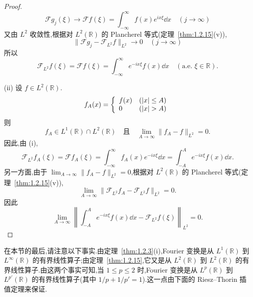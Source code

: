 \begin{proof}
\begin{equation*}
\mathcal{F}g_{j}(\xi) \to \mathcal{F}f(\xi) = \int_{-\infty}^{\infty} f(x)e^{ix\xi}\dd x \quad (j \to \infty)
\end{equation*}
又由 $L^{2}$ 收敛性,根据对 $L^{2}(\mathbb{R})$ 的 Plancherel 等式(定理~\ref{thm:1.2.15}(v)),
\begin{equation*}
\|\mathcal{F}g_{j} - \mathcal{F}_{L^{2}}f\|_{L^{2}} \to 0 \quad (j \to \infty)
\end{equation*}
所以
\begin{equation*}
\mathcal{F}_{L^{2}}f(\xi) = \mathcal{F}f(\xi) = \int_{-\infty}^{\infty} e^{-ix\xi}f(x)\dd x \quad (\text{a.e. } \xi \in \mathbb{R}).
\end{equation*}

(ii) 设 $f \in L^{2}(\mathbb{R})$.
\begin{equation*}
f_{A}(x) = \left\{ \begin{array}{l l}
f(x) & (|x| \leq A) \\
0 & (|x| > A)
\end{array} \right.
\end{equation*}
则
\begin{equation*}
f_{A} \in L^{1}(\mathbb{R}) \cap L^{2}(\mathbb{R}) \quad \text{且} \quad \lim_{A \to \infty}\|f_{A} - f\|_{L^{2}} = 0.
\end{equation*}
因此,由 (i),
\begin{equation*}
\mathcal{F}_{L^{2}}f_{A}(\xi) = \mathcal{F}f_{A}(\xi) = \int_{-\infty}^{\infty} f_{A}(x)e^{-ix\xi}\dd x = \int_{-A}^{A} e^{-ix\xi}f(x)\dd x.
\end{equation*}
另一方面,由于 $\lim_{A \to \infty}\|f_{A} - f\|_{L^{2}} = 0$,根据对 $L^{2}(\mathbb{R})$ 的 Plancherel 等式(定理~\ref{thm:1.2.15}(v)),
\begin{equation*}
\lim_{A \to \infty}\|\mathcal{F}_{L^{2}}f_{A} - \mathcal{F}_{L^{2}}f\|_{L^{2}} = 0.
\end{equation*}
因此
\begin{equation*}
\lim_{A \to \infty}\left\| \int_{-A}^{A} e^{-ix\xi}f(x)\dd x - \mathcal{F}_{L^{2}}f(\xi) \right\|_{L^{2}} = 0.
\end{equation*}
\end{proof}

在本节的最后,请注意以下事实.由定理~\ref{thm:1.2.3}(i),Fourier 变换是从 $L^{1}(\mathbb{R})$ 到 $L^{\infty}(\mathbb{R})$ 的有界线性算子;由定理~\ref{thm:1.2.15},它又是从 $L^{2}(\mathbb{R})$ 到 $L^{2}(\mathbb{R})$ 的有界线性算子.由这两个事实可知,当 $1 \leq p \leq 2$ 时,Fourier 变换是从 $L^{p}(\mathbb{R})$ 到 $L^{p'}(\mathbb{R})$ 的有界线性算子(其中 $1/p + 1/p' = 1$).这一点由下面的 Riesz--Thorin 插值定理来保证.

